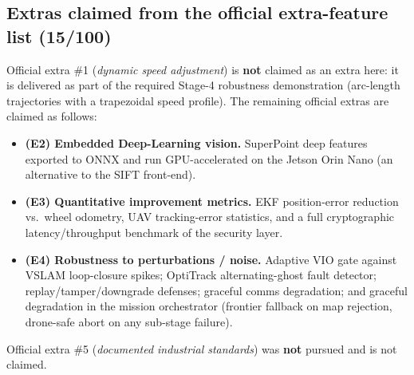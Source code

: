 \documentclass[11pt]{article}
\begin{document}
\subsection{Extras claimed from the official extra-feature list (15/100)}
Official extra \#1 (\emph{dynamic speed adjustment}) is \textbf{not} claimed as an
extra here: it is delivered as part of the required Stage-4 robustness
demonstration (arc-length trajectories with a trapezoidal speed profile). The
remaining official extras are claimed as follows:
\begin{itemize}[leftmargin=1.6em]
  \item \textbf{(E2) Embedded Deep-Learning vision.} SuperPoint deep features
        exported to ONNX and run GPU-accelerated on the Jetson Orin Nano (an
        alternative to the SIFT front-end).
  \item \textbf{(E3) Quantitative improvement metrics.} EKF position-error
        reduction vs.\ wheel odometry, UAV tracking-error statistics, and a full
        cryptographic latency/throughput benchmark of the security layer.
  \item \textbf{(E4) Robustness to perturbations / noise.} Adaptive VIO gate
        against VSLAM loop-closure spikes; OptiTrack alternating-ghost fault
        detector; replay/tamper/downgrade defenses; graceful comms degradation; and
        graceful degradation in the mission orchestrator (frontier fallback on map
        rejection, drone-safe abort on any sub-stage failure).
\end{itemize}
\noindent
Official extra \#5 (\emph{documented industrial standards}) was \textbf{not}
pursued and is not claimed.
\end{document}
